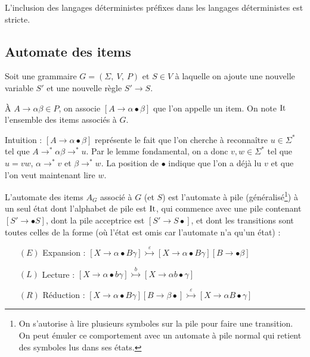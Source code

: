 \documentclass[../../agregation.tex]{subfiles}
\begin{document}
\begin{prop}
	L'inclusion des langages déterministes préfixes dans les langages
	déterministes est stricte.
\end{prop}

\subsection{Automate des items}

Soit une grammaire $G=\left(\Sigma,\ V,\ P\right)$ et $S\in V$ à
laquelle on ajoute une nouvelle variable $S'$ et une nouvelle règle
$S'\to S$.

À $A\to\alpha\beta\in P$, on associe $\left[A\to\alpha\bullet\beta\right]$
que l'on appelle un item. On note $\operatorname{It}$ l'ensemble des items associés
à $G$.

Intuition : $\left[A\to\alpha\bullet\beta\right]$ représente le fait
que l'on cherche à reconnaître $u\in\Sigma^{*}$ tel que $A\to^{*}\alpha\beta\to^{*}u$.
Par le lemme fondamental, on a donc $v,w\in\Sigma^{*}$ tel que $u=vw$,
$\alpha\to^{*}v$ et $\beta\to^{*}w$. La position de $\bullet$ indique
que l'on a déjà lu $v$ et que l'on veut maintenant lire $w$.
\begin{defn}
	
	L'automate des items $A_{G}$ associé à $G$ (et $S$) est l'automate
	à pile (généralisé\footnote{On s'autorise à lire plusieurs symboles sur la pile pour faire une transition. On peut émuler ce comportement avec un automate à pile normal qui retient des symboles lus dans ses états.}) à un seul état dont l'alphabet de pile est $\operatorname{It}$,
	qui commence avec une pile contenant $\left[S'\to\bullet S\right]$,
	dont la pile \og acceptrice \fg{} est $\left[S'\to S\bullet\right]$,
	et dont les transitions sont toutes celles de la forme (où l'état
	est omis car l'automate n'a qu'un état) :
	\begin{itemize}
		\item[$(E)$]  \og Expansion \fg{} : $\left[X\to\alpha\bullet B\gamma\right]\overset{\varepsilon}{\rightarrowtail}\left[X\to\alpha\bullet B\gamma\right]\left[B\to\bullet\beta\right]$
		\item[$(L)$]  \og Lecture \fg{} : $\left[X\to\alpha\bullet b\gamma\right]\overset{b}{\rightarrowtail}\left[X\to\alpha b\bullet\gamma\right]$
		\item[$(R)$]  \og Réduction \fg{} : $\left[X\to\alpha\bullet B\gamma\right]\left[B\to\beta\bullet\right]\overset{\varepsilon}{\rightarrowtail}\left[X\to\alpha B\bullet\gamma\right]$ 
	\end{itemize}
\end{defn}
\end{document}
